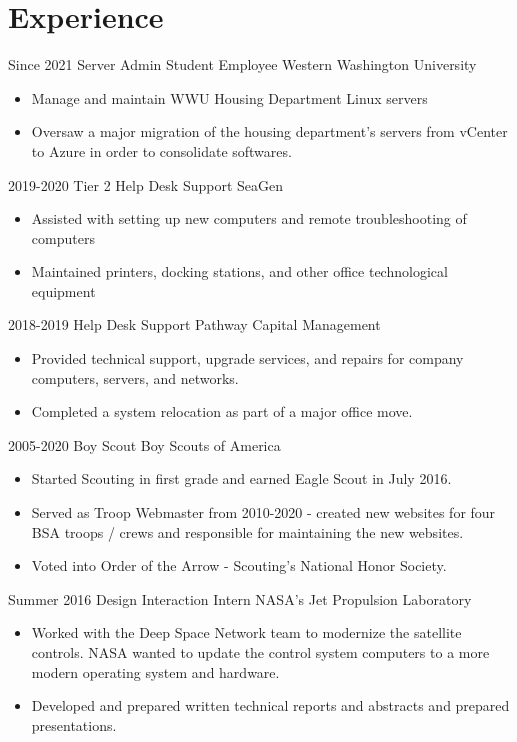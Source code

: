 \documentclass[letterpaper]{twentysecondcv} %
\begin{document}

\section{Experience}

\begin{twenty} %
	\twentyitem
	{Since 2021}
	{Server Admin Student Employee}
	{Western Washington University}
	{\begin{itemize}
			\item Manage and maintain WWU Housing Department Linux servers
			\item Oversaw a major migration of the housing department's servers from vCenter to Azure in order to consolidate softwares.
		\end{itemize}}
	\twentyitem
	{2019-2020}
	{Tier 2 Help Desk Support}
	{SeaGen}
	{\begin{itemize}
			\item Assisted with setting up new computers and remote troubleshooting of computers
			\item Maintained printers, docking stations, and other office technological equipment
		\end{itemize}}
	\twentyitem
	{2018-2019}
	{Help Desk Support}
	{Pathway Capital Management}
	{\begin{itemize}
			\item Provided technical support, upgrade services, and repairs for company computers, servers, and
			      networks.
			\item Completed a system relocation as part of a major office move.
		\end{itemize}}
	\twentyitem
	{2005-2020}
	{Boy Scout}
	{Boy Scouts of America}
	{\begin{itemize}
			\item Started Scouting in first grade and earned Eagle Scout in July 2016.
			\item Served as Troop Webmaster from 2010-2020 - created new websites for four BSA troops / crews and
			      responsible for maintaining the new websites.
			\item Voted into Order of the Arrow - Scouting's National Honor Society.
		\end{itemize}}
	\twentyitem
	{Summer 2016}
	{Design Interaction Intern}
	{NASA's Jet Propulsion Laboratory}
	{\begin{itemize}
			\item Worked with the Deep Space Network team to modernize the satellite controls.  NASA wanted to update the control system computers to a more modern operating system and hardware.
			\item Developed and prepared written technical reports and abstracts and prepared presentations.
		\end{itemize}}
\end{twenty}
\end{document}
